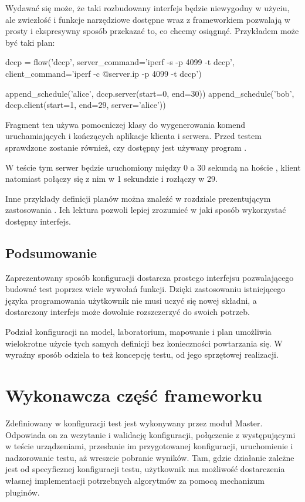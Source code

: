 \documentclass[00-praca-magisterska.tex]{subfiles}
\begin{document}
Wydawać się może, że taki rozbudowany interfejs będzie niewygodny w użyciu, ale
zwiezłość i funkcje narzędziowe dostępne wraz z frameworkiem pozwalają w prosty
i ekspresywny sposób przekazać to, co chcemy osiągnąć. Przykładem może być taki
plan:

\begin{pythoncode}
  dccp = flow('dccp',
      server_command='iperf -s -p 4099 -t dccp',
      client_command='iperf -c @{server.ip} -p 4099 -t dccp')

  append_schedule('alice', dccp.server(start=0, end=30))
  append_schedule('bob',   dccp.client(start=1, end=29, server='alice'))
\end{pythoncode}

Fragment ten używa pomocniczej klasy  do wygenerowania komend
uruchamiających i kończących aplikacje klienta i serwera. Przed testem
sprawdzone zostanie również, czy dostępny jest używany program .

W teście tym serwer będzie uruchomiony między 0 a 30 sekundą na
hoście , klient natomiast połączy się z nim w 1 sekundzie i rozłączy
w 29.

Inne przykłady definicji planów można znaleźć w rozdziale prezentującym
zastosowania . Ich lektura pozwoli lepiej zrozumieć
w jaki sposób wykorzystać dostępny interfejs.

\subsection{Podsumowanie}

Zaprezentowany sposób konfiguracji dostarcza prostego interfejsu pozwalającego
budować test poprzez wiele wywołań funkcji. Dzięki zastosowaniu istniejącego
języka programowania użytkownik nie musi uczyć się nowej składni, a dostarczony
interfejs może dowolnie rozszczerzyć do swoich potrzeb.

Podział konfiguracji na model, laboratorium, mapowanie i plan umożliwia
wielokrotne użycie tych samych definicji bez konieczności powtarzania się. W
wyraźny sposób odziela to też koncepcję testu, od jego sprzętowej realizacji.

\section{Wykonawcza część frameworku}

Zdefiniowany w konfiguracji test jest wykonywany przez moduł Master. Odpowiada
on za wczytanie i walidację konfiguracji, połączenie z występującymi w teście
urządzeniami, przesłanie im przygotowanej konfiguracji, uruchomienie i
nadzorowanie testu, aż wreszcie pobranie wyników. Tam, gdzie działanie zależne
jest od specyficznej konfiguracji testu, użytkownik ma możliwość dostarczenia
własnej implementacji potrzebnych algorytmów za pomocą mechanizum pluginów.
\end{document}
